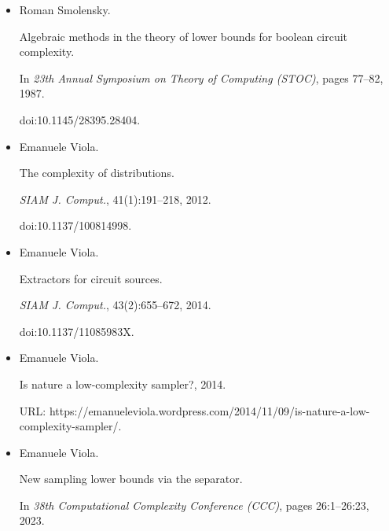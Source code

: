 \begin{itemize}
C. E. Shannon.


A mathematical theory of communication.


\emph{Bell System Tech. J.}, 27:379–423, 623–656, 1948.


doi:10.1002/j.1538-7305.1948.tb01338.x.





\item[] 
[41]

Roman Smolensky.


Algebraic methods in the theory of lower bounds for boolean circuit
complexity.


In \emph{23th Annual Symposium on Theory of Computing (STOC)}, pages
77–82, 1987.


doi:10.1145/28395.28404.





\item[] 
[42]

Emanuele Viola.


The complexity of distributions.


\emph{SIAM J. Comput.}, 41(1):191–218, 2012.


doi:10.1137/100814998.





\item[] 
[43]

Emanuele Viola.


Extractors for circuit sources.


\emph{SIAM J. Comput.}, 43(2):655–672, 2014.


doi:10.1137/11085983X.





\item[] 
[44]

Emanuele Viola.


Is nature a low-complexity sampler?, 2014.


URL:
https://emanueleviola.wordpress.com/2014/11/09/is-nature-a-low-complexity-sampler/.





\item[] 
[45]

Emanuele Viola.


New sampling lower bounds via the separator.


In \emph{38th Computational Complexity Conference (CCC)}, pages
26:1–26:23, 2023.



\end{itemize}
